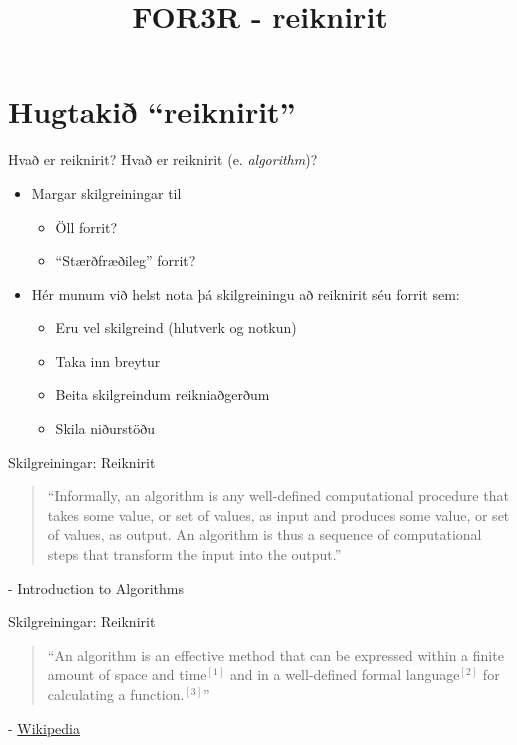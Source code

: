 \documentclass{beamer}
\title{FOR3R - reiknirit}
\begin{document}
\begin{frame}
\titlepage
\end{frame}

\section{Hugtakið ``reiknirit''}

\begin{frame}{Hvað er reiknirit?}
Hvað er reiknirit (e. \emph{algorithm})?
\begin{itemize}[<+->]
 \item Margar skilgreiningar til
 \begin{itemize}
  \item Öll forrit?
  \item ``Stærðfræðileg'' forrit?
 \end{itemize}
 \item Hér munum við helst nota þá skilgreiningu að reiknirit séu forrit sem:
 \begin{itemize}[<+->]
  \item Eru vel skilgreind (hlutverk og notkun)
  \item Taka inn breytur
  \item Beita skilgreindum reikniaðgerðum
  \item Skila niðurstöðu
 \end{itemize}
\end{itemize}
\end{frame}

\begin{frame}{Skilgreiningar: Reiknirit}
\begin{quote}
``Informally, an algorithm is any well-defined computational procedure that takes
some value, or set of values, as input and produces some value, or set of values, as
output. An algorithm is thus a sequence of computational steps that transform the
input into the output.''
\end{quote} - Introduction to Algorithms
\end{frame}

\begin{frame}{Skilgreiningar: Reiknirit}
\begin{quote}
``An algorithm is an effective method that can be expressed within a finite amount of space and time$^{[1]}$ and in a well-defined formal language$^{[2]}$ for calculating a function.$^{[3]}$''
\end{quote} - \href{http://en.wikipedia.org/wiki/Algorithm}{Wikipedia}
\end{frame}
\end{document}
